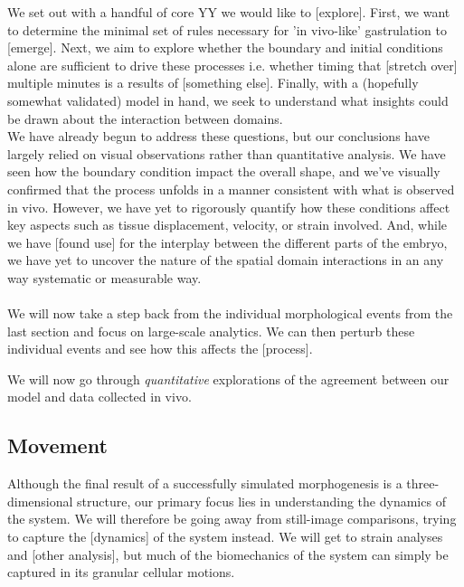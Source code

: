 We set out with a handful of core YY we would like to [explore]. First, we want to determine the minimal set of rules necessary for 'in vivo-like' gastrulation to [emerge]. Next, we aim to explore whether the boundary and initial conditions alone are sufficient to drive these processes i.e. whether timing that [stretch over] multiple minutes is a results of [something else]. Finally, with a (hopefully somewhat validated) model in hand, we seek to understand what insights could be drawn about the interaction between domains.\\


We have already begun to address these questions, but our conclusions have largely relied on visual observations rather than quantitative analysis. We have seen how the boundary condition impact the overall shape, and we've visually confirmed that the process unfolds in a manner consistent with what is observed in vivo. However, we have yet to rigorously quantify how these conditions affect key aspects such as tissue displacement, velocity, or strain involved. And, while we have [found use] for the interplay between the different parts of the embryo, we have yet to uncover the nature of the spatial domain interactions in an any way systematic or measurable way.\reph \\


\\
We will now take a step back from the individual morphological events from the last section and focus on large-scale analytics. We can then perturb these individual events and see how this affects the [process].



We will now go through \textit{quantitative} explorations of the agreement between our model and data collected in vivo. 


\subsection{Movement}
Although the final result of a successfully simulated morphogenesis is a three-dimensional structure, our primary focus lies in understanding the dynamics of the system. We will therefore be going away from still-image comparisons, trying to capture the [dynamics] of the system instead. We will get to strain analyses and [other analysis], but much of the biomechanics of the system can simply be captured in its granular cellular motions.\\

